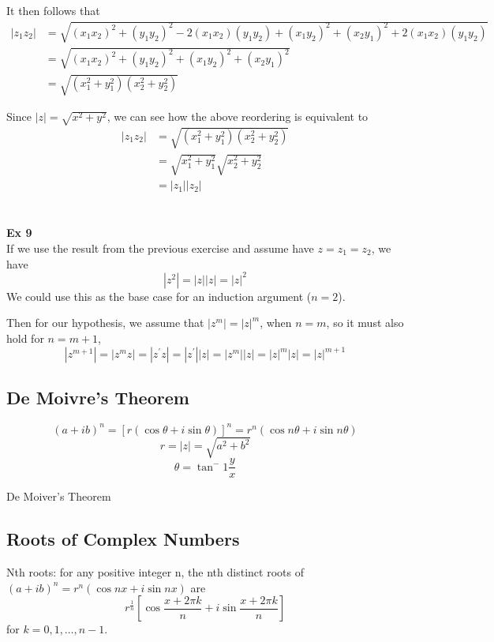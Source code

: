 It then follows that
\begin{align*}
|z_1 z_2| &= \sqrt{ (x_1 x_2)^2 + (y_1 y_2)^2 - 2(x_1 x_2)(y_1 y_2)   +   (x_1 y_2)^2 + (x_2 y_1)^2 + 2(x_1 x_2)(y_1 y_2) } \\
&= \sqrt{ (x_1 x_2)^2 + (y_1 y_2)^2   +  (x_1 y_2)^2 + (x_2 y_1)^2  } \\
&= \sqrt{ (x_{1}^{2} + y_{1}^{2}) (x_{2}^{2} + y_{2}^{2}) }
\end{align*}

Since $|z| = \sqrt{x^2 + y^2}$, we can see how the above reordering is equivalent to
\begin{align*}
|z_1 z_2| &= \sqrt{ (x_{1}^{2} + y_{1}^{2}) (x_{2}^{2} + y_{2}^{2}) } \\
&= \sqrt{ x_{1}^{2} + y_{1}^{2} } \sqrt{ x_{2}^{2} + y_{2}^{2} } \\
&= |z_1| |z_2|
\end{align*}
\\~\\


\textbf{Ex 9}
\\
If we use the result from the previous exercise and assume have $z = z_1 = z_2$, we have
$$
|z^2| = |z||z| = |z|^2
$$
We could use this as the base case for an induction argument ($n=2$).

Then for our hypothesis, we assume that $|z^m| = |z|^m$, when $n=m$, so it must also
hold for $n=m+1$,
$$
|z^{m+1}| = |z^m z| = |z^\prime z| = |z^\prime| |z| = |z^m| |z| = |z|^m |z| = |z|^{m+1}
$$


\subsection{De Moivre's Theorem}
$$
(a + ib)^n = [r(\cos \theta + i \sin \theta)]^n = r^n (\cos n\theta + i \sin n\theta)
$$
$$
r = |z| = \sqrt{a^2 + b^2}
$$
$$
\theta = \tan^-1 \frac{y}{x}
$$

De Moiver's Theorem 

\subsection{Roots of Complex Numbers}

Nth roots: for any positive integer n, the nth distinct roots of
$(a+ ib)^n = r^n (\cos nx +i\sin nx)$ are
$$
r^{\frac{1}{n}} \left[\cos \frac{x + 2\pi k}{n} + i\sin \frac{x + 2\pi k}{n}\right]
$$
for $k = 0, 1, \dots, n-1$.